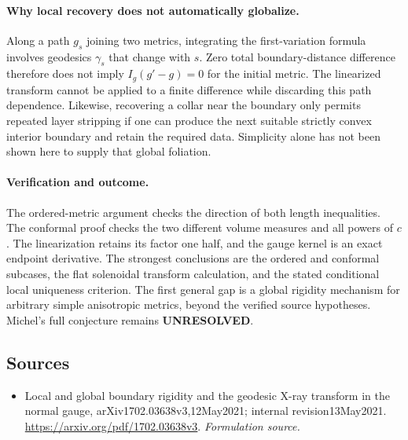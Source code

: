 \documentclass[11pt]{article}
\begin{document}
\paragraph{Why local recovery does not automatically globalize.}
Along a path $g_s$ joining two metrics, integrating the first-variation
formula involves geodesics $\gamma_s$ that change with $s$. Zero total
boundary-distance difference therefore does not imply
$I_g(g'-g)=0$ for the initial metric. The linearized transform cannot
be applied to a finite difference while discarding this path dependence.
Likewise, recovering a collar near the boundary only permits repeated
layer stripping if one can produce the next suitable strictly convex
interior boundary and retain the required data. Simplicity alone has
not been shown here to supply that global foliation.

\paragraph{Verification and outcome.}
The ordered-metric argument checks the direction of both length
inequalities. The conformal proof checks the two different volume
measures and all powers of $c$. The linearization retains its factor
one half, and the gauge kernel is an exact endpoint derivative.
The strongest conclusions are the ordered and conformal subcases,
the flat solenoidal transform calculation, and the stated conditional
local uniqueness criterion. The first general gap is a global rigidity
mechanism for arbitrary simple anisotropic metrics, beyond the verified
source hypotheses. Michel's full conjecture remains
\textbf{UNRESOLVED}.

\subsection{Sources}
\begin{itemize}
\item[S1]Local and global boundary rigidity and the geodesic X-ray transform in the normal gauge, arXiv1702.03638v3,12May2021; internal revision13May2021.
\url{https://arxiv.org/pdf/1702.03638v3}.
\textit{Formulation source.}
\end{itemize}
\end{document}
